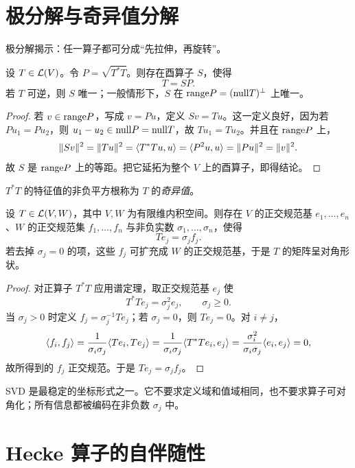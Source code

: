 \section{极分解与奇异值分解}

极分解揭示：任一算子都可分成“先拉伸，再旋转”。

\begin{theorem}[极分解]
设 $T\in\mathcal{L}(V)$。令 $P=\sqrt{T^*T}$。则存在酉算子 $S$，使得
\[
T=SP.
\]
若 $T$ 可逆，则 $S$ 唯一；一般情形下，$S$ 在 $\mathrm{range} P=(\mathrm{null} T)^\perp$ 上唯一。
\end{theorem}

\begin{proof}
若 $v\in\mathrm{range} P$，写成 $v=Pu$，定义 $Sv=Tu$。这一定义良好，因为若 $Pu_1=Pu_2$，则 $u_1-u_2\in\mathrm{null} P=\mathrm{null} T$，故 $Tu_1=Tu_2$。并且在 $\mathrm{range} P$ 上，
\[
\|Sv\|^2=\|Tu\|^2=\langle T^*Tu, u \rangle=\langle P^2u, u \rangle=\|Pu\|^2=\|v\|^2.
\]
故 $S$ 是 $\mathrm{range} P$ 上的等距。把它延拓为整个 $V$ 上的酉算子，即得结论。
\end{proof}

\begin{definition}
$T^*T$ 的特征值的非负平方根称为 $T$ 的\emph{奇异值}。
\end{definition}

\begin{theorem}[奇异值分解]
设 $T\in\mathcal{L}(V,W)$，其中 $V,W$ 为有限维内积空间。则存在 $V$ 的正交规范基 $e_1,\dots,e_n$、$W$ 的正交规范集 $f_1,\dots,f_n$ 与非负实数 $\sigma_1,\dots,\sigma_n$，使得
\[
Te_j=\sigma_j f_j.
\]
若去掉 $\sigma_j=0$ 的项，这些 $f_j$ 可扩充成 $W$ 的正交规范基，于是 $T$ 的矩阵呈对角形状。
\end{theorem}

\begin{proof}
对正算子 $T^*T$ 应用谱定理，取正交规范基 $e_j$ 使
\[
T^*Te_j=\sigma_j^2e_j,\qquad \sigma_j\ge 0.
\]
当 $\sigma_j>0$ 时定义 $f_j=\sigma_j^{-1}Te_j$；若 $\sigma_j=0$，则 $Te_j=0$。对 $i\neq j$，
\[
\langle f_i, f_j \rangle=\frac{1}{\sigma_i\sigma_j}\langle Te_i, Te_j \rangle
=\frac{1}{\sigma_i\sigma_j}\langle T^*Te_i, e_j \rangle
=\frac{\sigma_i^2}{\sigma_i\sigma_j}\langle e_i, e_j \rangle=0,
\]
故所得到的 $f_j$ 正交规范。于是 $Te_j=\sigma_j f_j$。
\end{proof}

\begin{remark}
SVD 是最稳定的坐标形式之一。它不要求定义域和值域相同，也不要求算子可对角化；所有信息都被编码在非负数 $\sigma_j$ 中。
\end{remark}

\section{Hecke 算子的自伴随性}


